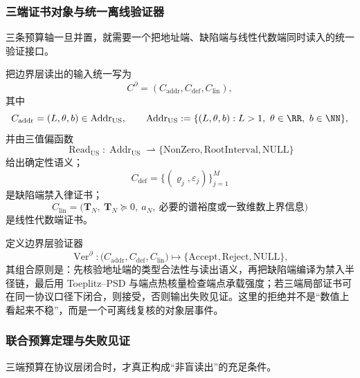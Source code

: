 \subsubsection{三端证书对象与统一离线验证器}\label{subsubsec:typed-address-biaxial-completion-boundary-verifier}
三条预算轴一旦并置，就需要一个把地址端、缺陷端与线性代数端同时读入的统一验证接口。

\begin{definition}[三端证书对象]\label{def:typed-address-biaxial-completion-boundary-triple-certificate}
把边界层读出的输入统一写为
\[
C^{\partial}=(C_{\mathrm{addr}},C_{\mathrm{def}},C_{\mathrm{lin}}),
\]
其中
\[
C_{\mathrm{addr}}=(L,\theta,b)\in \operatorname{Addr}_{\mathrm{US}},
\qquad
\operatorname{Addr}_{\mathrm{US}}:=\{(L,\theta,b):L>1,\ \theta\in\RR,\ b\in\NN\},
\]
并由三值偏函数
\[
\operatorname{Read}_{\mathrm{US}}:\operatorname{Addr}_{\mathrm{US}}\rightharpoonup
\{\mathrm{NonZero},\mathrm{RootInterval},\mathrm{NULL}\}
\]
给出确定性语义；
\[
C_{\mathrm{def}}=\{(\varrho_j,\varepsilon_j)\}_{j=1}^{M}
\]
是缺陷端禁入律证书；
\[
C_{\mathrm{lin}}=
\bigl(
\mathbf{T}_N,\ \mathbf{T}_N\succeq 0,\ a_N,\ \text{必要的谱裕度或一致维数上界信息}
\bigr)
\]
是线性代数端证书。
\end{definition}

\begin{definition}[统一离线验证器]\label{def:typed-address-biaxial-completion-boundary-verifier}
定义边界层验证器
\[
\operatorname{Ver}^{\partial}:
\bigl(C_{\mathrm{addr}},C_{\mathrm{def}},C_{\mathrm{lin}}\bigr)
\longmapsto
\{\mathrm{Accept},\mathrm{Reject},\mathrm{NULL}\},
\]
其组合原则是：先核验地址端的类型合法性与读出语义，再把缺陷端编译为禁入半径链，最后用 Toeplitz--PSD 与端点热核量检查端点承载强度；若三端局部证书可在同一协议口径下闭合，则接受，否则输出失败见证。这里的拒绝并不是“数值上看起来不稳”，而是一个可离线复核的对象层事件。
\end{definition}

\subsubsection{联合预算定理与失败见证}\label{subsubsec:typed-address-biaxial-completion-boundary-joint-theorem}
三端预算在协议层闭合时，才真正构成“非盲读出”的充足条件。

